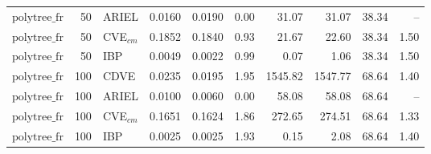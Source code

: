 \begin{table}[ht]
\begin{tabular}{lrlrrrrrrr}
$\text{polytree\_fr}$ & 50 & ARIEL & 0.0160 & 0.0190 & 0.00 & 31.07 & 31.07 & 38.34 & -- \\
$\text{polytree\_fr}$ & 50 & CVE$_{cm}$ & 0.1852 & 0.1840 & 0.93 & 21.67 & 22.60 & 38.34 & 1.50 \\
$\text{polytree\_fr}$ & 50 & IBP & 0.0049 & 0.0022 & 0.99 & 0.07 & 1.06 & 38.34 & 1.50 \\
\hline
$\text{polytree\_fr}$ & 100 & CDVE & 0.0235 & 0.0195 & 1.95 & 1545.82 & 1547.77 & 68.64 & 1.40 \\
$\text{polytree\_fr}$ & 100 & ARIEL & 0.0100 & 0.0060 & 0.00 & 58.08 & 58.08 & 68.64 & -- \\
$\text{polytree\_fr}$ & 100 & CVE$_{cm}$ & 0.1651 & 0.1624 & 1.86 & 272.65 & 274.51 & 68.64 & 1.33 \\
$\text{polytree\_fr}$ & 100 & IBP & 0.0025 & 0.0025 & 1.93 & 0.15 & 2.08 & 68.64 & 1.40 \\
\bottomrule
\end{tabular}
\end{table}
